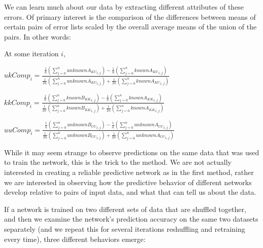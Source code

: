\documentclass{acm_proc_article-sp}
\begin{document}
  We can learn much about our data by extracting different attributes of these errors. Of primary interest is the comparison of the differences between means of certain pairs of error lists scaled by the overall average means of the union of the pairs. In other words:

  At some iteration $i$,

  $ukComp_i = \frac{\frac{1}{n}\left(\sum\limits_{j=0}^n{{unknownA_{KU}}_{i,j}}\right) - \frac{1}{n}\left(\sum\limits_{j=0}^n{{knownA_{KU}}_{i,j}}\right)}{\frac{1}{2n}\left(\sum\limits_{j=0}^n{{unknownA_{KU}}_{i,j}}\right) + \frac{1}{2n}\left(\sum\limits_{j=0}^n{{knownA_{KU}}_{i,j}}\right)}$

  $kkComp_i = \frac{\frac{1}{n}\left(\sum\limits_{j=0}^n{{knownB_{KK}}_{i,j}}\right) - \frac{1}{n}\left(\sum\limits_{j=0}^n{{knownA_{KK}}_{i,j}}\right)}{\frac{1}{2n}\left(\sum\limits_{j=0}^n{{knownB_{KK}}_{i,j}}\right) + \frac{1}{2n}\left(\sum\limits_{j=0}^n{{knownA_{KK}}_{i,j}}\right)}$

  $uuComp_i = \frac{\frac{1}{n}\left(\sum\limits_{j=0}^n{{unknownB_{UU}}_{i,j}}\right) - \frac{1}{n}\left(\sum\limits_{j=0}^n{{unknownA_{UU}}_{i,j}}\right)}{\frac{1}{2n}\left(\sum\limits_{j=0}^n{{unknownB_{UU}}_{i,j}}\right) + \frac{1}{2n}\left(\sum\limits_{j=0}^n{{unknownA_{UU}}_{i,j}}\right)}$

  While it may seem strange to observe predictions on the same data that was used to train the network, this is the trick to the method. We are not actually interested in creating a reliable predictive network as in the first method, rather we are interested in observing how the predictive behavior of different networks develop relative to pairs of input data, and what that can tell us about the data.
  
  If a network is trained on two different sets of data that are shuffled together, and then we examine the network's prediction accuracy on the same two datasets separately (and we repeat this for several iterations reshuffling and retraining every time), three different behaviors emerge:
  
\end{document}
